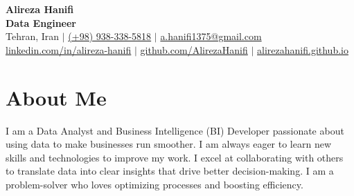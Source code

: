 \documentclass[11pt, a4paper]{article}
\begin{document}
\begin{center}
    {\Huge \textbf{Alireza Hanifi}} \\[1ex]
    {\Large \textbf{Data Engineer}} \\[1ex]
    Tehran, Iran $|$
    \href{tel:+989383385818}{(+98) 938-338-5818} $|$
    \href{mailto:a.hanifi1375@gmail.com}{a.hanifi1375@gmail.com} \\[.5ex]
    \href{https://www.linkedin.com/in/alireza-hanifi}{linkedin.com/in/alireza-hanifi} $|$
    \href{https://github.com/AlirezaHanifi}{github.com/AlirezaHanifi} $|$
    \href{https://alirezahanifi.github.io/}{alirezahanifi.github.io}
\end{center}

\section{About Me}
I am a Data Analyst and Business Intelligence (BI) Developer passionate about using data to make businesses run smoother. I am always eager to learn new skills and technologies to improve my work. I excel at collaborating with others to translate data into clear insights that drive better decision-making. I am a problem-solver who loves optimizing processes and boosting efficiency.

\end{document}
